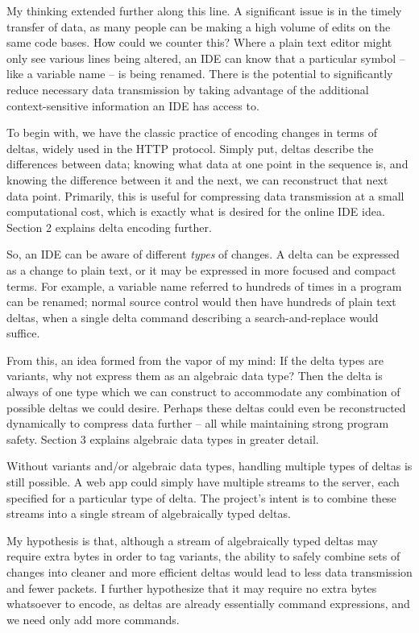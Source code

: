 \documentclass[12pt,a4paper]{article}
\begin{document}
	My thinking extended further along this line. A significant issue is in the timely transfer of data, as many people can be making a high volume of edits on the same code bases. How could we counter this? Where a plain text editor might only see various lines being altered, an IDE can know that a particular symbol -- like a variable name -- is being renamed. There is the potential to significantly reduce necessary data transmission by taking advantage of the additional context-sensitive information an IDE has access to.
	
	To begin with, we have the classic practice of encoding changes in terms of deltas, widely used in the HTTP protocol\cite{BenefitsDeltaEncodingHTTP,DeltaEncodingHTTP}. Simply put, deltas describe the differences between data; knowing what data at one point in the sequence is, and knowing the difference between it and the next, we can reconstruct that next data point. Primarily, this is useful for compressing data transmission at a small computational cost, which is exactly what is desired for the online IDE idea. Section 2 explains delta encoding further.
	
	So, an IDE can be aware of different \textit{types} of changes. A delta can be expressed as a change to plain text, or it may be expressed in more focused and compact terms. For example, a variable name referred to hundreds of times in a program can be renamed; normal source control would then have hundreds of plain text deltas, when a single delta command describing a search-and-replace would suffice.
	
	From this, an idea formed from the vapor of my mind: If the delta types are variants, why not express them as an algebraic data type? Then the delta is always of one type which we can construct to accommodate any combination of possible deltas we could desire. Perhaps these deltas could even be reconstructed dynamically to compress data further --  all while maintaining strong program safety. Section 3 explains algebraic data types in greater detail.
	
	Without variants and/or algebraic data types, handling multiple types of deltas is still possible. A web app could simply have multiple streams to the server, each specified for a particular type of delta. The project's intent is to combine these streams into a single stream of algebraically typed deltas.
	
	My hypothesis is that, although a stream of algebraically typed deltas may require extra bytes in order to tag variants, the ability to safely combine sets of changes into cleaner and more efficient deltas would lead to less data transmission and fewer packets. I further hypothesize that it may require no extra bytes whatsoever to encode, as deltas are already essentially command expressions, and we need only add more commands.
	
\end{document}
